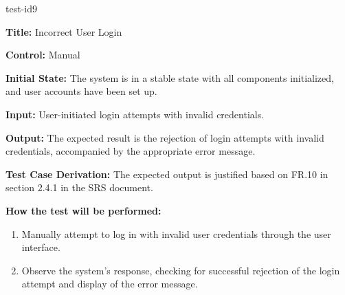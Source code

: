 \documentclass[12pt, titlepage]{article}
\begin{document}
\begin{itemize}
    \begin{item}
        test-id9
        \begin{mdframed}[linewidth=0.5mm]
            \textbf{Title:} Incorrect User Login \par
            \textbf{Control:} Manual \par
            \textbf{Initial State:} The system is in a stable state with all components initialized, and user accounts have been set up. \par
            \textbf{Input:} User-initiated login attempts with invalid credentials. \par
            \textbf{Output:} The expected result is the rejection of login attempts with invalid credentials, accompanied by the appropriate error message. \par
            \textbf{Test Case Derivation:} The expected output is justified based on FR.10 in section 2.4.1 in the SRS document. \par
            \textbf{How the test will be performed:}
            \begin{enumerate}[noitemsep]
                \item Manually attempt to log in with invalid user credentials through the user interface.
                \item Observe the system's response, checking for successful rejection of the login attempt and display of the error message.
            \end{enumerate}
        \end{mdframed}
    \end{item}


\end{itemize}
\end{document}
